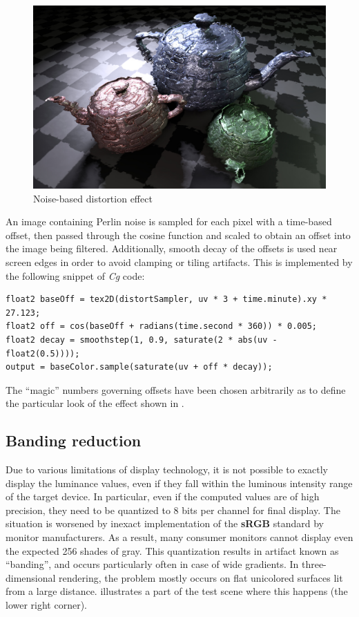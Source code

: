 \begin{figure}[ht!]
  \centering
    \includegraphics[width=0.9\linewidth]{./Figures/postProc/distortion.jpg}
    \caption[Distortion]{Noise-based distortion effect}
  \label{fig:postProcDistortion}
\end{figure}

An image containing Perlin noise is sampled for each pixel with a time-based offset, then passed through the cosine function and scaled to obtain an offset into the image being filtered. Additionally, smooth decay of the offsets is used near screen edges in order to avoid clamping or tiling artifacts. This is implemented by the following snippet of \emph{Cg} code:

\noindent\begin{minipage}{\textwidth}
\begin{lstlisting}[frame=single]
float2 baseOff = tex2D(distortSampler, uv * 3 + time.minute).xy * 27.123;
float2 off = cos(baseOff + radians(time.second * 360)) * 0.005;
float2 decay = smoothstep(1, 0.9, saturate(2 * abs(uv - float2(0.5))));
output = baseColor.sample(saturate(uv + off * decay));
\end{lstlisting}
\end{minipage}

The ``magic'' numbers governing offsets have been chosen arbitrarily as to define the particular look of the effect shown in .

\subsection{Banding reduction}

Due to various limitations of display technology, it is not possible to exactly display the luminance values, even if they fall within the luminous intensity range of the target device. In particular, even if the computed values are of high precision, they need to be quantized to 8 bits per channel for final display. The situation is worsened by inexact implementation of the \textbf{sRGB} standard by monitor manufacturers. As a result, many consumer monitors cannot display even the expected 256 shades of gray. This quantization results in artifact known as ``banding'', and occurs particularly often in case of wide gradients. In three-dimensional rendering, the problem mostly occurs on flat unicolored surfaces lit from a large distance.  illustrates a part of the test scene where this happens (the lower right corner).


